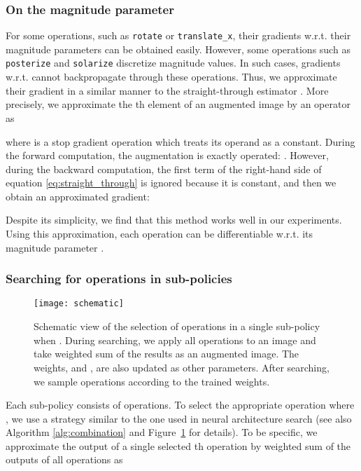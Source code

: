 \documentclass[10pt,twocolumn,letterpaper]{article}
\def\Figref#1{Figure~\ref{#1}}
\begin{document}
\subsubsection*{On the magnitude parameter }\label{subsub:magnitude}

For some operations, such as \texttt{rotate} or \texttt{translate\_x}, their gradients w.r.t. their magnitude parameters  can be obtained easily. However, some operations such as \texttt{posterize} and \texttt{solarize} discretize magnitude values. In such cases, gradients w.r.t.  cannot backpropagate through these operations. Thus, we approximate their gradient in a similar manner to the straight-through estimator \cite{Bengio2013,Oord2017}. More precisely, we approximate the th element of an augmented image by an operator  as



\noindent where  is a stop gradient operation which treats its operand as a constant. During the forward computation, the augmentation is exactly operated: . However, during the backward computation, the first term of the right-hand side of equation \ref{eq:straight_through} is ignored because it is constant, and then we obtain an approximated gradient:



Despite its simplicity, we find that this method works well in our experiments. Using this approximation, each operation  can be differentiable w.r.t. its magnitude parameter .

\subsubsection*{Searching for operations in sub-policies}

\begin{figure}[tb]
    \centering
    \texttt{[image: schematic]}
    \caption{Schematic view of the selection of operations in a single sub-policy when . During searching, we apply all operations to an image and take weighted sum of the results as an augmented image. The weights,  and , are also updated as other parameters. After searching, we sample operations according to the trained weights.}
    \label{fig:soft_path}
\end{figure}
                        
Each sub-policy  consists of  operations. To select the appropriate operation  where , we use a strategy similar to the one used in neural architecture search \cite{Liu2018c} (see also Algorithm \ref{alg:combination} and \Figref{fig:soft_path} for details). To be specific, we approximate the output of a single selected th operation  by weighted sum of the outputs of all operations as 
\end{document}
